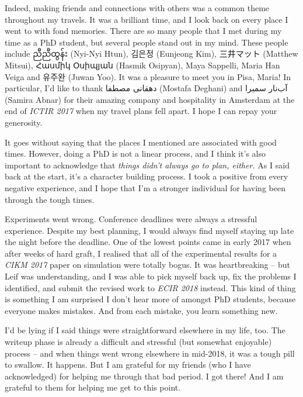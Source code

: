 \begin{preamble}
Indeed, making friends and connections with others was a common theme throughout my travels. It was a brilliant time, and I look back on every place I went to with fond memories. There are so many people that I met during my time as a PhD student, but several people stand out in my mind. These people include {\burmesefont ညီညီထွန်း} (Nyi-Nyi Htun), {\asianfont 김은정} (Eunjeong Kim), {\asianfont 三井マット} (Matthew Mitsui), {\armenianfont Հասմիկ Օսիպյան} (Hasmik Osipyan), Maya Sappelli, Maria Han Veiga and {\asianfont 유주완} (Juwan Yoo). It was a pleasure to meet you in Pisa, Maria! In particular, I'd like to thank {\farsifont دهقانی مصطفا} (Mostafa Deghani) and {\farsifont آب‌نار سمیرا} (Samira Abnar) for their amazing company and hospitality in Amsterdam at the end of \emph{ICTIR 2017} when my travel plans fell apart. I hope I can repay your generosity.

It goes without saying that the places I mentioned are associated with good times. However, doing a PhD is not a linear process, and I think it's also important to acknowledge that \emph{things didn't always go to plan, either.} As I said back at the start, it's a character building process. I took a positive from every negative experience, and I hope that I'm a stronger individual for having been through the tough times.

Experiments went wrong. Conference deadlines were always a stressful experience. Despite my best planning, I would always find myself staying up late the night before the deadline. One of the lowest points came in early 2017 when after weeks of hard graft, I realised that all of the experimental results for a \emph{CIKM 2017} paper on simulation were totally bogus. It was heartbreaking -- but Leif was understanding, and I was able to pick myself back up, fix the problems I identified, and submit the revised work to \emph{ECIR 2018} instead. This kind of thing is something I am surprised I don't hear more of amongst PhD students, because everyone makes mistakes. And from each mistake, you learn something new.

I'd be lying if I said things were straightforward elsewhere in my life, too. The writeup phase is already a difficult and stressful (but somewhat enjoyable) process -- and when things went wrong elsewhere in mid-2018, it was a tough pill to swallow. It happens. But I am grateful for my friends (who I have acknowledged) for helping me through that bad period. I got there! And I am grateful to them for helping me get to this point.


\end{preamble}
